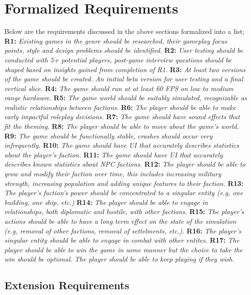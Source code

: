\documentclass{report}
\newcommand{\req}[2]{\textbf{		#1:  }	\textit{#2}\newline\newline}
\begin{document}
\chapter{Formalized Requirements}
Below are the requirements discussed in the above sections formalized into a list;
\newline
\newline
\req{R1}{Existing games in the genre should be researched, their gameplay focus points, style and design problems should be identified.}
\req{R2}{User testing should be conducted with 5+ potential players, post-game interview questions should be shaped based on insights gained from completion of R1.}
\req{R3}{At least two versions of the game should be created. An initial beta version for user testing and a final vertical slice.}
\req{R4}{The game should run at at least 60 FPS on low to medium range hardware.}
\req{R5}{The game world should be suitably simulated, recognizable as realistic relationships between factions.}
\req{R6}{The player should be able to make early impactful roleplay decisions.}
\req{R7}{The game should have sound effects that fit the theming.}
\req{R8}{The player should be able to move about the game's world.}
\req{R9}{The game should be functionally stable, crashes should occur very infrequently.}
\req{R10}{The game should have UI that accurately describes statistics about the player's faction.}
\req{R11}{The game should have UI that accurately describes known statistics about NPC factions.}
\req{R12}{The player should be able to grow and modify their faction over time, this includes increasing military strength, increasing population and adding unique features to their faction.}
\req{R13}{The player's faction's power should be concentrated to a singular entity (e.g, one building, one ship, etc.)}
\req{R14}{The player should be able to engage in relationships, both diplomatic and hostile, with other factions.}
\req{R15}{The player's actions should be able to have a long term effect on the state of the simulation (e.g, removal of other factions, removal of settelments, etc.).}
\req{R16}{The player's singular entity should be able to engage in combat with other entites.}
\req{R17}{The player should be able to win the game in some manner but the choice to take the win should be optional. The player should be able to keep playing if they wish.}

\section{Extension Requirements}
\end{document}
